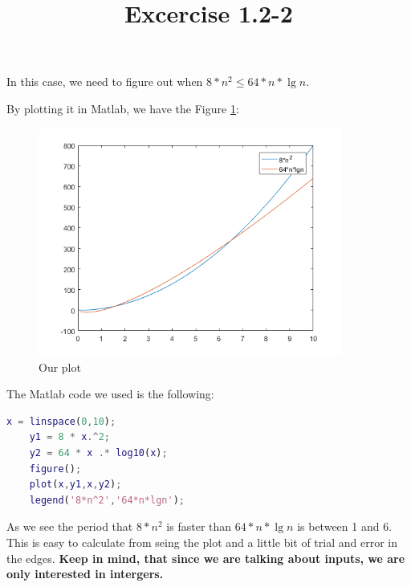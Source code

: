 \documentclass{article}
\title{Excercise 1.2-2}
\begin{document}
\date{}
\author{}

\maketitle

In this case, we need to figure out when $ 8 * n^{2} \leq 64* n * \lg{n} $.

By plotting it in Matlab, we have the Figure \ref{fig:plot1}:

\begin{figure}
    \includegraphics[width=10cm]{images/1-2-2.png}
    \centering
    \caption{Our plot}
    \label{fig:plot1}
\end{figure}

The Matlab code we used is the following:

\begin{lstlisting}[language=Matlab]
    x = linspace(0,10);
    y1 = 8 * x.^2;
    y2 = 64 * x .* log10(x);
    figure();
    plot(x,y1,x,y2);
    legend('8*n^2','64*n*lgn');
\end{lstlisting}

As we see the period that $8*n^{2}$ is faster than $64*n*\lg{n}$ is between 1 and 6. This is easy to calculate from seing the plot and a little bit of trial and error in the edges. \textbf{Keep in mind, that since we are talking about inputs, we are only interested in intergers.}
\end{document}
